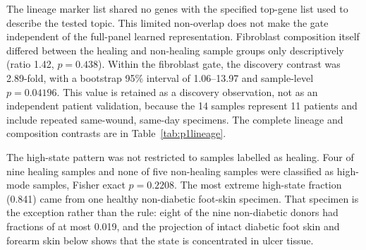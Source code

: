 The lineage marker list shared no genes with the specified top-gene list used to describe the tested topic. This limited non-overlap does not make the gate independent of the full-panel learned representation. Fibroblast composition itself differed between the healing and non-healing sample groups only descriptively (ratio 1.42, $p=0.438$). Within the fibroblast gate, the discovery contrast was 2.89-fold, with a bootstrap 95\% interval of 1.06--13.97 and sample-level $p=0.04196$. This value is retained as a discovery observation, not as an independent patient validation, because the 14 samples represent 11 patients and include repeated same-wound, same-day specimens. The complete lineage and composition contrasts are in Table~\ref{tab:p1lineage}.

The high-state pattern was not restricted to samples labelled as healing. Four of nine healing samples and none of five non-healing samples were classified as high-mode samples, Fisher exact $p=0.2208$. The most extreme high-state fraction (0.841) came from one healthy non-diabetic foot-skin specimen. That specimen is the exception rather than the rule: eight of the nine non-diabetic donors had fractions of at most 0.019, and the projection of intact diabetic foot skin and forearm skin below shows that the state is concentrated in ulcer tissue.

